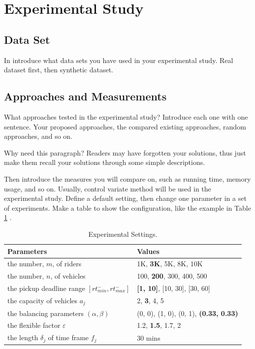 \section{Experimental Study}
\label{sec:experimental}

\subsection{Data Set}
In introduce what data sets you have used in your experimental study. Real dataset first, then synthetic dataset.

\subsection{Approaches and Measurements}
What approaches tested in the experimental study? Introduce each one with one sentence. Your proposed approaches, the compared existing approaches, random approaches, and so on. 

Why need this paragraph? Readers may have forgotten your solutions, thus just make them recall your solutions through some simple descriptions.

Then introduce the measures you will compare on, such as running time, memory usage, and so on. Usually, control variate method will be used in the experimental study. Define a default setting, then change one parameter in a set of experiments. Make a table to show the configuration, like the example in Table \ref{tab:settings} \cite{cheng2017utility}.

\begin{table}[t]
	\begin{center}
		{\small\scriptsize %
			\caption{\small Experimental Settings.} \label{tab:settings}
			\begin{tabular}{l|l}
				{\bf \qquad \qquad \quad Parameters} & {\bf \qquad \qquad \qquad Values} \\ \hline \hline
				the number, $m$, of riders  & 1K,  \textbf{3K}, 5K, 8K, 10K\\
				the number, $n$, of vehicles  & 100, \textbf{200}, 300, 400, 500 \\
				the pickup deadline range $[rt^-_{min}, rt^-_{max}]$  & \textbf{[1, 10]}, [10, 30], [30, 60]\\
				the capacity of vehicles $a_j$ & 2, \textbf{3}, 4, 5\\
				the balancing parameters $(\alpha, \beta)$& (0, 0), (1, 0), (0, 1), \textbf{(0.33, 0.33)}\\
				the flexible factor $\varepsilon$ & 1.2, \textbf{1.5}, 1.7, 2\\
				the length $\delta_j$ of time frame $f_j$ & 30 mins\\
				\hline
			\end{tabular}
		}\vspace{-2ex}
	\end{center}
\end{table}

